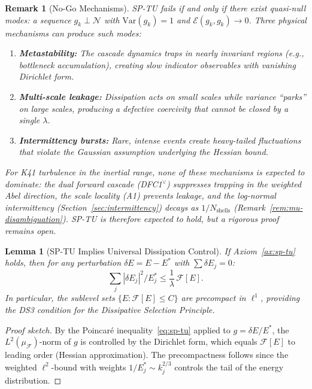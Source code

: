 \documentclass[12pt,a4paper]{article}
\theoremstyle{breakdef}
\theoremstyle{breakplain}
\newtheorem{lemma}[definition]{Lemma}
\theoremstyle{breakdef}
\newtheorem{remark}[definition]{Remark}
\begin{document}
\begin{remark}[No-Go Mechanisms]\label{rem:sp-nogo}
SP-TU fails if and only if there exist \emph{quasi-null modes}: a sequence $g_k \perp \mathcal{N}$ with $\mathrm{Var}(g_k) = 1$ and $\mathcal{E}(g_k, g_k) \to 0$. Three physical mechanisms can produce such modes:
\begin{enumerate}
\item \textbf{Metastability:} The cascade dynamics traps in nearly invariant regions (e.g., bottleneck accumulation), creating slow indicator observables with vanishing Dirichlet form.
\item \textbf{Multi-scale leakage:} Dissipation acts on small scales while variance ``parks'' on large scales, producing a defective coercivity that cannot be closed by a single $\lambda$.
\item \textbf{Intermittency bursts:} Rare, intense events create heavy-tailed fluctuations that violate the Gaussian assumption underlying the Hessian bound.
\end{enumerate}
For K41 turbulence in the inertial range, none of these mechanisms is expected to dominate: the dual forward cascade (DFC1$^\vee$) suppresses trapping in the weighted Abel direction, the scale locality (A1) prevents leakage, and the log-normal intermittency (Section~\ref{sec:intermittency}) decays as $1/N_{\mathrm{shells}}$ (Remark~\ref{rem:mu-disambiguation}). SP-TU is therefore \emph{expected} to hold, but a rigorous proof remains open.
\end{remark}

\begin{lemma}[SP-TU Implies Universal Dissipation Control]\label{lem:sp-dissipation}
If Axiom~\ref{ax:sp-tu} holds, then for any perturbation $\delta E = E - E^*$ with $\sum \delta E_j = 0$:
\begin{equation}
  \sum_j |\delta E_j|^2 / E_j^* \leq \frac{1}{\lambda}\, \mathcal{F}[E].
\end{equation}
In particular, the sublevel sets $\{E : \mathcal{F}[E] \leq C\}$ are precompact in $\ell^1$, providing the DS3 condition for the Dissipative Selection Principle.
\end{lemma}

\begin{proof}[Proof sketch]
By the Poincaré inequality~\eqref{eq:sp-tu} applied to $g = \delta E / E^*$, the $L^2(\mu_{\mathcal{F}})$-norm of $g$ is controlled by the Dirichlet form, which equals $\mathcal{F}[E]$ to leading order (Hessian approximation). The precompactness follows since the weighted $\ell^2$-bound with weights $1/E_j^* \sim k_j^{2/3}$ controls the tail of the energy distribution.
\end{proof}
\end{document}
